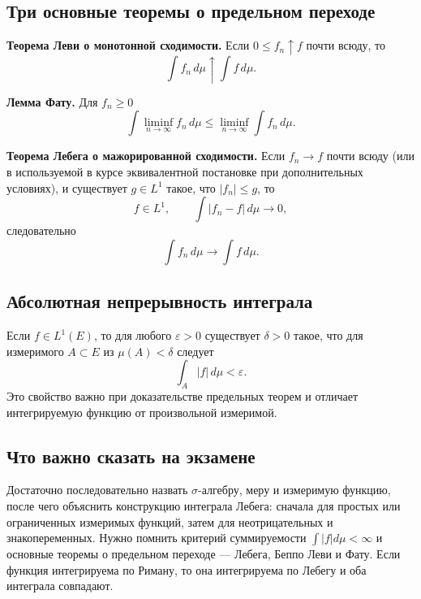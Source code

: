 \subsection{Три основные теоремы о предельном переходе}

\textbf{Теорема Леви о монотонной сходимости.} Если
$0\le f_n\uparrow f$ почти всюду, то
\[
    \int f_n\,d\mu\uparrow\int f\,d\mu.
\]

\textbf{Лемма Фату.} Для $f_n\ge0$
\[
    \int \liminf_{n\to\infty} f_n\,d\mu
    \le \liminf_{n\to\infty}\int f_n\,d\mu.
\]

\textbf{Теорема Лебега о мажорированной сходимости.} Если $f_n\to f$ почти всюду
(или в используемой в курсе эквивалентной постановке при дополнительных условиях),
и существует $g\in L^1$ такое, что $|f_n|\le g$, то
\[
    f\in L^1,\qquad
    \int |f_n-f|\,d\mu\to0,
\]
следовательно
\[
    \int f_n\,d\mu\to\int f\,d\mu.
\]

\subsection{Абсолютная непрерывность интеграла}

Если $f\in L^1(E)$, то для любого $\varepsilon>0$ существует $\delta>0$ такое,
что для измеримого $A\subset E$ из $\mu(A)<\delta$ следует
\[
    \int_A |f|\,d\mu<\varepsilon.
\]
Это свойство важно при доказательстве предельных теорем и отличает интегрируемую
функцию от произвольной измеримой.

\subsection{Что важно сказать на экзамене}

Достаточно последовательно назвать $\sigma$-алгебру, меру и измеримую функцию,
после чего объяснить конструкцию интеграла Лебега: сначала для простых или
ограниченных измеримых функций, затем для неотрицательных и знакопеременных.
Нужно помнить критерий суммируемости $\int|f|d\mu<\infty$ и основные теоремы о
предельном переходе --- Лебега, Беппо Леви и Фату. Если функция интегрируема по
Риману, то она интегрируема по Лебегу и оба интеграла совпадают.

\newpage

